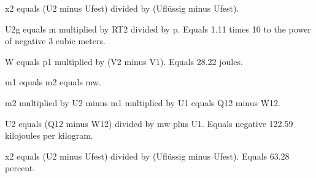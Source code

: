 x2 equals (U2 minus Ufest) divided by (Uflüssig minus Ufest).  

U2g equals m multiplied by RT2 divided by p.  
Equals 1.11 times 10 to the power of negative 3 cubic meters.  

W equals p1 multiplied by (V2 minus V1).  
Equals 28.22 joules.  

m1 equals m2 equals mw.  

m2 multiplied by U2 minus m1 multiplied by U1 equals Q12 minus W12.  

U2 equals (Q12 minus W12) divided by mw plus U1.  
Equals negative 122.59 kilojoules per kilogram.  

x2 equals (U2 minus Ufest) divided by (Uflüssig minus Ufest).  
Equals 63.28 percent.